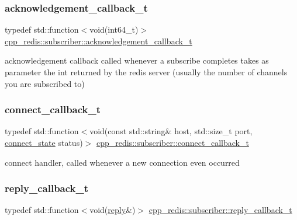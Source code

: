\subsubsection{\texorpdfstring{acknowledgement\+\_\+callback\+\_\+t}{acknowledgement\_callback\_t}}
{\footnotesize\ttfamily typedef std\+::function$<$void(int64\+\_\+t)$>$ \hyperlink{classcpp__redis_1_1subscriber_a19ea39dfabeb19937a9ce4c8d21781b4}{cpp\+\_\+redis\+::subscriber\+::acknowledgement\+\_\+callback\+\_\+t}}

acknowledgement callback called whenever a subscribe completes takes as parameter the int returned by the redis server (usually the number of channels you are subscribed to) \mbox{\label{classcpp__redis_1_1subscriber_a90f2f7d4c748c3c2e89d1e977fa6dce1}} 
\subsubsection{\texorpdfstring{connect\+\_\+callback\+\_\+t}{connect\_callback\_t}}
{\footnotesize\ttfamily typedef std\+::function$<$void(const std\+::string\& host, std\+::size\+\_\+t port, \hyperlink{classcpp__redis_1_1subscriber_afc976757efd9d0ac4def6935546a2338}{connect\+\_\+state} status)$>$ \hyperlink{classcpp__redis_1_1subscriber_a90f2f7d4c748c3c2e89d1e977fa6dce1}{cpp\+\_\+redis\+::subscriber\+::connect\+\_\+callback\+\_\+t}}

connect handler, called whenever a new connection even occurred \mbox{\label{classcpp__redis_1_1subscriber_a99d220cc662664e2399b709f61ac9581}} 
\subsubsection{\texorpdfstring{reply\+\_\+callback\+\_\+t}{reply\_callback\_t}}
{\footnotesize\ttfamily typedef std\+::function$<$void(\hyperlink{classcpp__redis_1_1reply}{reply}\&)$>$ \hyperlink{classcpp__redis_1_1subscriber_a99d220cc662664e2399b709f61ac9581}{cpp\+\_\+redis\+::subscriber\+::reply\+\_\+callback\+\_\+t}}

